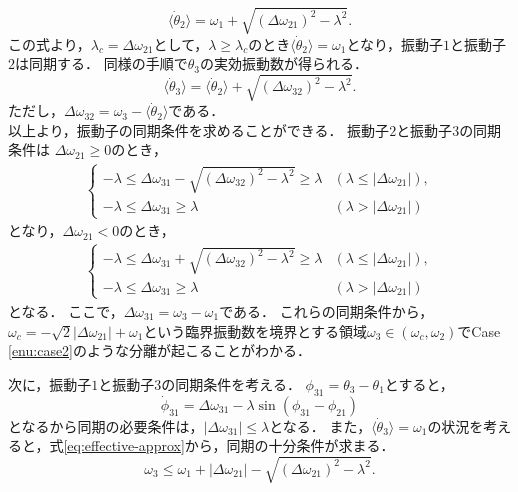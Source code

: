 \documentclass[../main]{subfiles}
\begin{document}
\begin{equation}
    \langle\dot{\theta}_2\rangle=\omega_1+\sqrt{(\Delta\omega_{21})^2-\lambda^2}.
\end{equation}
この式より，$\lambda_c=\Delta\omega_{21}$として，$\lambda\geq\lambda_c$のとき$\langle\dot{\theta}_2\rangle=\omega_1$となり，振動子$1$と振動子$2$は同期する．
同様の手順で$\theta_3$の実効振動数が得られる．
\begin{equation}
    \label{eq:effective-approx}
    \langle\dot{\theta}_3\rangle=\langle\dot{\theta}_2\rangle+\sqrt{(\Delta\omega_{32})^2-\lambda^2}.
\end{equation}
ただし，$\Delta\omega_{32}=\omega_3-\langle\dot{\theta}_2\rangle$である．\\
以上より，振動子の同期条件を求めることができる．
振動子$2$と振動子$3$の同期条件は
$\Delta\omega_{21}\geq 0$のとき，
\begin{align}
    \begin{cases}
        -\lambda\leq\Delta\omega_{31}-\sqrt{(\Delta\omega_{32})^2-\lambda^2}\geq\lambda & (\lambda\leq|\Delta\omega_{21}|),\\
        -\lambda\leq\Delta\omega_{31}\geq\lambda & (\lambda>|\Delta\omega_{21}|)
    \end{cases}
\end{align}
となり，$\Delta\omega_{21}< 0$のとき，
\begin{align}
    \begin{cases}
        -\lambda\leq\Delta\omega_{31}+\sqrt{(\Delta\omega_{32})^2-\lambda^2}\geq\lambda & (\lambda\leq|\Delta\omega_{21}|),\\
        -\lambda\leq\Delta\omega_{31}\geq\lambda & (\lambda>|\Delta\omega_{21}|)
    \end{cases}
\end{align}
となる．
ここで，$\Delta\omega_{31}=\omega_3-\omega_1$である．
これらの同期条件から，$\omega_c=-\sqrt{2}|\Delta\omega_{21}|+\omega_1$という臨界振動数を境界とする領域$\omega_3\in(\omega_c,\omega_2)$でCase \ref{enu:case2}のような分離が起こることがわかる．

次に，振動子$1$と振動子$3$の同期条件を考える．
$\phi_{31}=\theta_3-\theta_1$とすると，
\begin{equation}
    \dot{\phi}_{31}=\Delta\omega_{31}-\lambda\sin(\phi_{31}-\phi_{21})
\end{equation}
となるから同期の必要条件は，$|\Delta\omega_{31}|\leq \lambda$となる．
また，$\langle\dot{\theta}_3\rangle=\omega_1$の状況を考えると，式\eqref{eq:effective-approx}から，同期の十分条件が求まる．
\begin{equation}
    \omega_3\leq\omega_1+|\Delta\omega_{21}|-\sqrt{(\Delta\omega_{21})^2-\lambda^2}.
\end{equation}
\end{document}

